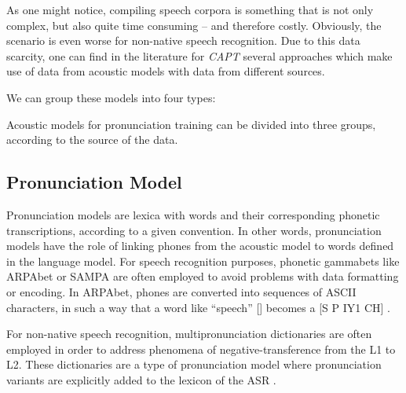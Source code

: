 \documentclass[twocolumn]{bmcart}%
\begin{document}
As one might notice, compiling speech corpora is something that is not only complex, but also quite time consuming -- and therefore costly. Obviously, the scenario is even worse for non-native speech recognition.
Due to this data scarcity, one can find in the literature for \emph{CAPT} several approaches which make use of data from acoustic models with data from different sources.

We can group these models into four types:


Acoustic models for pronunciation training can be divided into three groups,
according to the source of the data. 


\subsection*{\textbf{Pronunciation Model}}

Pronunciation models are lexica with words and their corresponding phonetic transcriptions, according to a given convention. In other words, pronunciation models have the role of linking phones from the acoustic model to words defined in the language model. For speech recognition purposes, phonetic gammabets like ARPAbet or SAMPA are often employed to avoid problems with data formatting or encoding. In ARPAbet, phones are converted into sequences of ASCII characters, in such a way that a word like ``speech'' [] becomes a [S P IY1 CH] \cite{CMUDict2015}.

For non-native speech recognition, multipronunciation dictionaries are often employed in order to address phenomena of negative-transference from the L1 to L2. These dictionaries are a type of pronunciation model where pronunciation variants are explicitly added to the lexicon of the ASR \cite{Strik2001}.
\end{document}
